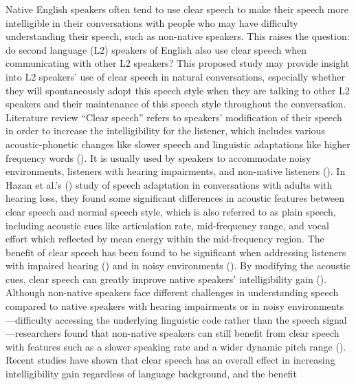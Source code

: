 \documentclass[
  man,
  floatsintext,
  longtable,
  nolmodern,
  notxfonts,
  notimes,
  colorlinks=true,linkcolor=blue,citecolor=blue,urlcolor=blue]{apa7}
\begin{document}
Native English speakers often tend to use clear speech to make their
speech more intelligible in their conversations with people who may have
difficulty understanding their speech, such as non-native speakers. This
raises the question: do second language (L2) speakers of English also
use clear speech when communicating with other L2 speakers? This
proposed study may provide insight into L2 speakers' use of clear speech
in natural conversations, especially whether they will spontaneously
adopt this speech style when they are talking to other L2 speakers and
their maintenance of this speech style throughout the conversation.
Literature review ``Clear speech'' refers to speakers' modification of
their speech in order to increase the intelligibility for the listener,
which includes various acoustic-phonetic changes like slower speech and
linguistic adaptations like higher frequency words
(). It is
usually used by speakers to accommodate noisy environments, listeners
with hearing impairments, and non-native listeners
(). In Hazan et
al.'s () study of speech adaptation
in conversations with adults with hearing loss, they found some
significant differences in acoustic features between clear speech and
normal speech style, which is also referred to as plain speech,
including acoustic cues like articulation rate, mid-frequency range, and
vocal effort which reflected by mean energy within the mid-frequency
region. The benefit of clear speech has been found to be significant
when addressing listeners with impaired hearing
() and in
noisy environments
(). By modifying the acoustic cues, clear speech can greatly improve
native speakers' intelligibility gain
(). Although
non-native speakers face different challenges in understanding speech
compared to native speakers with hearing impairments or in noisy
environments---difficulty accessing the underlying linguistic code
rather than the speech signal---researchers found that non-native
speakers can still benefit from clear speech with features such as a
slower speaking rate and a wider dynamic pitch range
(). Recent
studies have shown that clear speech has an overall effect in increasing
intelligibility gain regardless of language background, and the benefit
\end{document}
